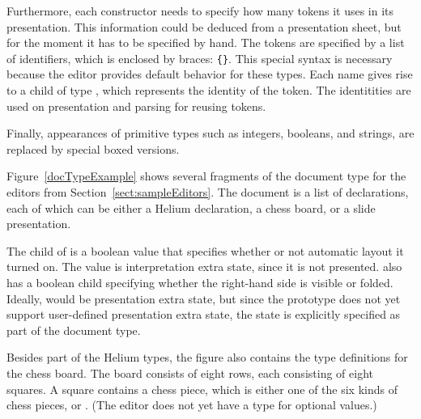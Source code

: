 
Furthermore, each constructor needs to specify how many tokens it uses in its presentation. This information could be deduced from a presentation sheet, but for the moment it has to be specified by hand.  The tokens are specified by a list of identifiers, which is enclosed by braces: 
\verb|{|\verb|}|. This special syntax is necessary because the editor provides default behavior for these types.  Each name gives rise to a child of type , which represents the identity of the token. The identitities are used on presentation and parsing for reusing tokens. 




Finally, appearances of primitive types such as integers, booleans, and strings, are replaced by special boxed versions. 



Figure~\ref{docTypeExample} shows several fragments of the document type for the editors from Section~\ref{sect:sampleEditors}. The document is a list of declarations, each of which can be either a Helium declaration, a chess board, or a slide presentation. 

The  child of  is a boolean value that specifies whether or not automatic layout it turned on. The value is interpretation extra state, since it is not presented.   also has a boolean child  specifying whether the right-hand side is visible or folded. Ideally,  would be presentation extra state, but since the prototype does not yet support user-defined presentation extra state, the  state is explicitly specified as part of the document type.

Besides part of the Helium types, the figure also contains the type definitions for the chess board. The board consists of eight rows, each consisting of eight squares. A square contains a chess piece, which is either one of the six kinds of chess pieces, or . (The editor does not yet have a  type for optional values.)

